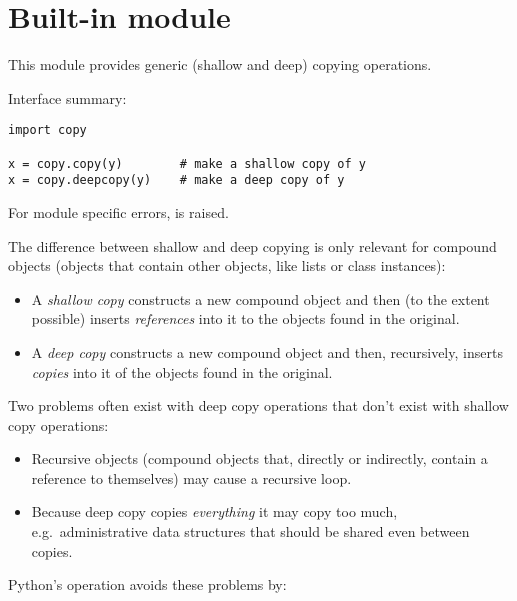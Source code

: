 \section{Built-in module }

This module provides generic (shallow and deep) copying operations.

Interface summary:

\begin{verbatim}
import copy

x = copy.copy(y)        # make a shallow copy of y
x = copy.deepcopy(y)    # make a deep copy of y
\end{verbatim}

For module specific errors,  is raised.

The difference between shallow and deep copying is only relevant for
compound objects (objects that contain other objects, like lists or
class instances):

\begin{itemize}

\item
A {\em shallow copy} constructs a new compound object and then (to the
extent possible) inserts {\em references} into it to the objects found
in the original.

\item
A {\em deep copy} constructs a new compound object and then,
recursively, inserts {\em copies} into it of the objects found in the
original.

\end{itemize}

Two problems often exist with deep copy operations that don't exist
with shallow copy operations:

\begin{itemize}

\item
Recursive objects (compound objects that, directly or indirectly,
contain a reference to themselves) may cause a recursive loop.

\item
Because deep copy copies {\em everything} it may copy too much, e.g.\
administrative data structures that should be shared even between
copies.

\end{itemize}

Python's  operation avoids these problems by:

